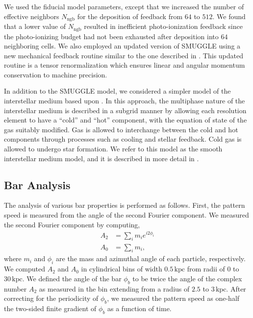 \documentclass[twocolumn,linenumbers,trackchanges]{aastex631}
\newcommand{\SMUGGLE}{SMUGGLE}
\begin{document}
We used the fiducial model parameters, except that we increased the number of
effective neighbors $N_{\textrm{ngb}}$ for the deposition of feedback from $64$
to $512$. We found that a lower value of $N_{\textrm{ngb}}$ resulted in
inefficient photo-ionization feedback since the photo-ionizing budget had not
been exhausted after deposition into $64$ neighboring cells. We also employed an
updated version of \SMUGGLE{} using a new mechanical feedback routine similar to
the one described in \citet{2018MNRAS.480..800H}. This updated routine is a
tensor renormalization which ensures linear and angular momentum conservation to
machine precision.

In addition to the \SMUGGLE{} model, we considered a simpler model of the
interstellar medium based upon \citet{2003MNRAS.339..289S}. In this approach,
the multiphase nature of the interstellar medium is described in a subgrid
manner by allowing each resolution element to have a ``cold'' and ``hot''
component, with the equation of state of the gas suitably modified. Gas is
allowed to interchange between the cold and hot components through processes
such as cooling and stellar feedback. Cold gas is allowed to undergo star
formation. We refer to this model as the smooth interstellar medium model, and
it is described in more detail in \citet{2019MNRAS.489.4233M}.

\subsection{Bar Analysis}
\label{ssec:bar_analysis}
The analysis of various bar properties is performed as follows. First, the
pattern speed is measured from the angle of the second Fourier component. We
measured the second Fourier component by computing,
\begin{equation}
\begin{split}
A_2 &= \sum_i m_i e^{i 2 \phi_i} \\
A_0 &= \sum_i m_i \textrm{,}
\end{split}
\end{equation}
where $m_i$ and $\phi_i$ are the mass and azimuthal angle of each particle,
respectively. We computed $A_2$ and $A_0$ in cylindrical bins of width
$0.5\,\textrm{kpc}$ from radii of $0$ to $30\,\textrm{kpc}$. We defined the
angle of the bar $\phi_b$ to be twice the angle of the complex number $A_2$ as
measured in the bin extending from a radius of $2.5$ to $3\,\textrm{kpc}$.
After correcting for the periodicity of $\phi_b$, we measured the pattern
speed as one-half the two-sided finite gradient of $\phi_b$ as a function of
time.
\end{document}
